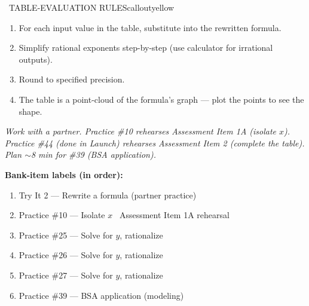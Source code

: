 \documentclass[11pt]{article}
\begin{document}
\begin{callout}{\IconBook\ TABLE-EVALUATION RULES}{calloutyellow}
\begin{enumerate}[leftmargin=2.1em,itemsep=2pt,topsep=3pt]
  \item For each input value in the table, substitute into the rewritten formula.
  \item Simplify rational exponents step-by-step (use calculator for irrational outputs).
  \item Round to specified precision.
  \item The table is a point-cloud of the formula's graph --- plot the points to see the shape.
\end{enumerate}
\end{callout}

\textit{Work with a partner. Practice \#10 rehearses Assessment Item 1A (isolate \(x\)). Practice \#44 (done in Launch) rehearses Assessment Item 2 (complete the table). Plan \(\sim\)8 min for \#39 (BSA application).}

\textbf{Bank-item labels (in order):}
\begin{enumerate}[leftmargin=1.6em,itemsep=2pt,topsep=2pt]
  \item Try It 2 --- Rewrite a formula (partner practice)
  \item Practice \#10 --- Isolate \(x\) \IconStar\ Assessment Item 1A rehearsal
  \item Practice \#25 --- Solve for \(y\), rationalize
  \item Practice \#26 --- Solve for \(y\), rationalize
  \item Practice \#27 --- Solve for \(y\), rationalize
  \item Practice \#39 --- BSA application (modeling)
\end{enumerate}



\end{document}
